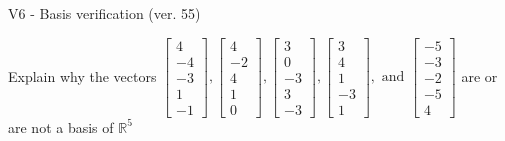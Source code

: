 \begin{exercise}
  \begin{exerciseTitle}V6 - Basis verification (ver. 55)\end{exerciseTitle}
  \begin{exerciseStatement}
    Explain why the vectors \(\left[\begin{array}{r}
4 \\
-4 \\
-3 \\
1 \\
-1
\end{array}\right] , \left[\begin{array}{r}
4 \\
-2 \\
4 \\
1 \\
0
\end{array}\right] , \left[\begin{array}{r}
3 \\
0 \\
-3 \\
3 \\
-3
\end{array}\right] , \left[\begin{array}{r}
3 \\
4 \\
1 \\
-3 \\
1
\end{array}\right] , \text{ and } \left[\begin{array}{r}
-5 \\
-3 \\
-2 \\
-5 \\
4
\end{array}\right]\) are or are not a basis of \(\mathbb{R}^5\)	



\end{exerciseStatement}
\end{exercise}
